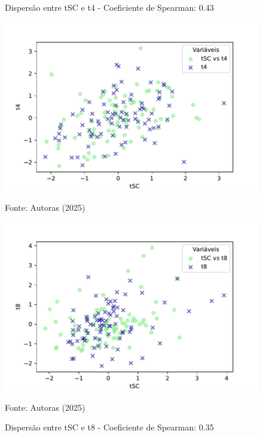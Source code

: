 \begin{figure}[h]
    \captionsetup{font=footnotesize, justification=centering, labelsep=period, position=above}
    \centering
    \begin{minipage}[b]{0.45\linewidth}
        \caption{Dispersão entre tSC e t4 - Coeficiente de Spearman: 0.43}
        \label{fig:tSC-t4}
        \centering
        \includegraphics[scale=0.35]{figuras/Spearman/tSC-t4.pdf}
        \vspace{0.3cm}
        \begin{minipage}{\linewidth}
            \centering
            \scriptsize{Fonte: Autoras (2025)}
        \end{minipage}
    \end{minipage}
    \hspace{0.05\linewidth}
    \begin{minipage}[b]{0.45\linewidth}
        \caption{Dispersão entre tSC e t8 - Coeficiente de Spearman: 0.35}
        \label{fig:tSC-t8}
        \centering
        \includegraphics[scale=0.35]{figuras/Spearman/tSC-t8.pdf}
        \vspace{0.3cm}
        \begin{minipage}{\linewidth}
            \centering
            \scriptsize{Fonte: Autoras (2025)}
        \end{minipage}
    \end{minipage}
\end{figure}
\FloatBarrier

